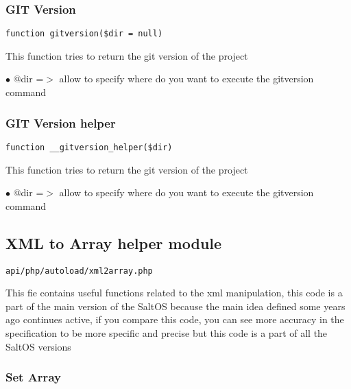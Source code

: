 \documentclass[a4paper]{article}
\begin{document}
\hypertarget{toc272}{}
\subsubsection{GIT Version}

\begin{lstlisting}
function gitversion($dir = null)
\end{lstlisting}

This function tries to return the git version of the project

\begin{compactitem}
\item[\color{myblue}$\bullet$] @dir =$>$ allow to specify where do you want to execute the gitversion command
\end{compactitem}

\hypertarget{toc273}{}
\subsubsection{GIT Version helper}

\begin{lstlisting}
function __gitversion_helper($dir)
\end{lstlisting}

This function tries to return the git version of the project

\begin{compactitem}
\item[\color{myblue}$\bullet$] @dir =$>$ allow to specify where do you want to execute the gitversion command
\end{compactitem}

\hypertarget{toc274}{}
\subsection{XML to Array helper module}

\begin{lstlisting}
api/php/autoload/xml2array.php
\end{lstlisting}

This fie contains useful functions related to the xml manipulation, this code is a part of the
main version of the SaltOS because the main idea defined some years ago continues active, if you
compare this code, you can see more accuracy in the specification to be more specific and precise
but this code is a part of all the SaltOS versions

\hypertarget{toc275}{}
\subsubsection{Set Array}
\end{document}
